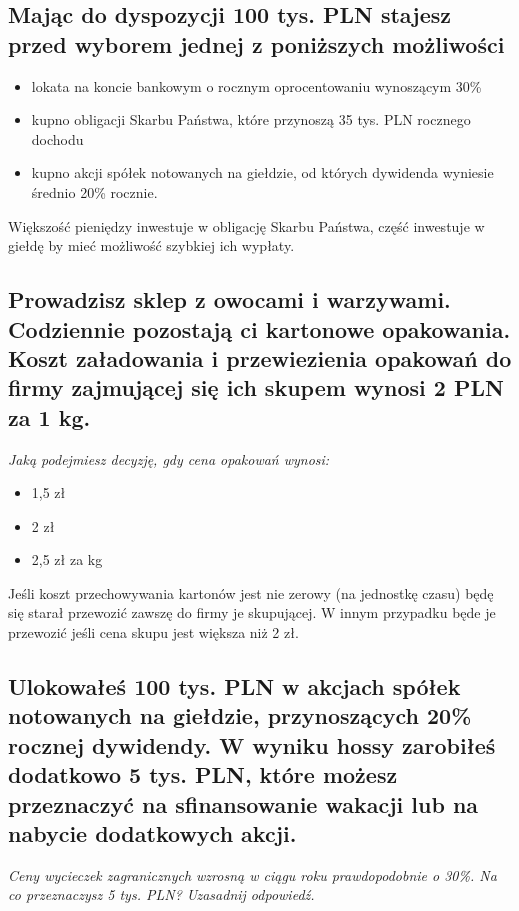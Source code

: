 \documentclass[a4paper,12pt]{article}
\begin{document}
\subsection{Mając do dyspozycji 100 tys. PLN stajesz przed wyborem jednej z poniższych możliwości}

\begin{itemize}
	\item lokata na koncie bankowym o rocznym oprocentowaniu wynoszącym 30\% 
	\item kupno obligacji Skarbu Państwa, które przynoszą 35 tys. PLN rocznego dochodu
	\item kupno akcji spółek notowanych na giełdzie, od których dywidenda wyniesie średnio 20\% rocznie.
\end{itemize}

Większość pieniędzy inwestuje w obligację Skarbu Państwa, część inwestuje w giełdę by mieć możliwość szybkiej ich wypłaty.

\subsection{Prowadzisz sklep z owocami i warzywami. Codziennie pozostają ci kartonowe opakowania. Koszt załadowania i przewiezienia opakowań do firmy zajmującej się ich skupem wynosi 2 PLN za 1 kg. }

\emph{Jaką podejmiesz decyzję, gdy cena opa­kowań wynosi:}

\begin{itemize}
	\item 1,5 zł
	\item 2 zł
	\item 2,5 zł za kg
\end{itemize}

Jeśli koszt przechowywania kartonów jest nie zerowy (na jednostkę czasu) będę się starał przewozić zawszę do firmy je skupującej. W innym przypadku będe je przewozić jeśli cena skupu jest większa niż 2 zł.

\subsection{Ulokowałeś 100 tys. PLN w akcjach spółek notowanych na giełdzie, przy­noszących 20\% rocznej dywidendy. W wyniku hossy zarobiłeś dodatkowo 5 tys. PLN, które możesz przeznaczyć na sfinansowanie wakacji lub na nabycie dodatkowych akcji.}

\emph{Ceny wycieczek zagranicznych wzrosną w ciągu roku prawdopodobnie o 30\%. 
Na co przeznaczysz 5 tys. PLN? Uzasadnij odpo­wiedź.}
\end{document}
